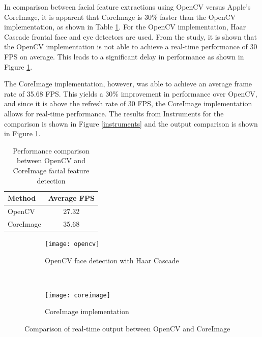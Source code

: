 \documentclass[10pt,twocolumn,letterpaper]{article}
\begin{document}
In comparison between facial feature extractions using OpenCV versus Apple's CoreImage, it is apparent that CoreImage is 30\% faster than the OpenCV implementation, as shown in Table \ref{table:FPS}.  For the OpenCV implementation, Haar Cascade frontal face and eye detectors are used.  From the study, it is shown that the OpenCV implementation is not able to achieve a real-time performance of 30 FPS on average.  This leads to a significant delay in performance as shown in Figure \ref{compare}.

The CoreImage implementation, however, was able to achieve an average frame rate of 35.68 FPS.  This yields a 30\% improvement in performance over OpenCV, and since it is above the refresh rate of 30 FPS, the CoreImage implementation allows for real-time performance.  The results from Instruments for the comparison is shown in Figure \ref{instruments} and the output comparison is shown in Figure \ref{compare}.
\\

\begin{table}[h]
\begin{center}
\begin{tabular}{|l|c|}
\hline
Method & Average FPS \\
\hline\hline
OpenCV & 27.32 \\
CoreImage & 35.68 \\
\hline
\end{tabular}
\end{center}
\caption{Performance comparison between OpenCV and CoreImage facial feature detection}
\label{table:FPS}
\end{table}

\begin{figure}[h!]
    \centering
    \begin{subfigure}[t]{0.5\linewidth}
        \centering
        \texttt{[image: opencv]}
        \caption{OpenCV face detection with Haar Cascade}
    \end{subfigure}%
    ~ 
    \begin{subfigure}[t]{0.5\linewidth}
        \centering
        \texttt{[image: coreimage]}
        \caption{CoreImage implementation}
    \end{subfigure}
    \caption{Comparison of real-time output between OpenCV and CoreImage}
    \label{compare}
\end{figure}
\end{document}
